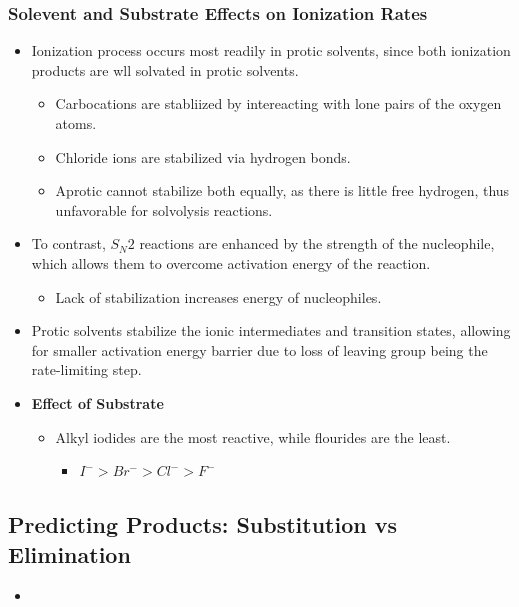 \documentclass[12pt,a4paper]{article}
\begin{document}
\begin{itemize}
    \subsubsection{Solevent and Substrate Effects on Ionization Rates}
    \begin{itemize}
        \item Ionization process occurs most readily in {\color{o-Sun}protic solvents}, since both ionization products are wll solvated in protic solvents.
            \begin{itemize}
                \item Carbocations are stabliized by intereacting with lone pairs of the oxygen atoms.
                \item Chloride ions are stabilized via hydrogen bonds.
                \item Aprotic cannot stabilize both equally, as there is little free hydrogen, thus unfavorable for solvolysis reactions.
            \end{itemize}
        \item To contrast, \(S_N2\) reactions are enhanced by the {\color{o-Sun}strength of the nucleophile}, which allows them to overcome activation energy of the reaction.
            \begin{itemize}
                \item Lack of stabilization increases energy of nucleophiles.
            \end{itemize}
        \item Protic solvents stabilize the ionic intermediates and transition states, allowing for smaller activation energy barrier due to loss of leaving group being the rate-limiting step.
        \item \textbf{Effect of Substrate}
            \begin{itemize}
                \item Alkyl iodides are the most reactive, while flourides are the least.
                    \begin{itemize}
                        \item \(I^->Br^->Cl^->F^-\)
                    \end{itemize}
            \end{itemize}
    \end{itemize}
\end{itemize}

\subsection{Predicting Products: Substitution vs Elimination}
\begin{itemize}
    \item 
\end{itemize}
\end{document}
